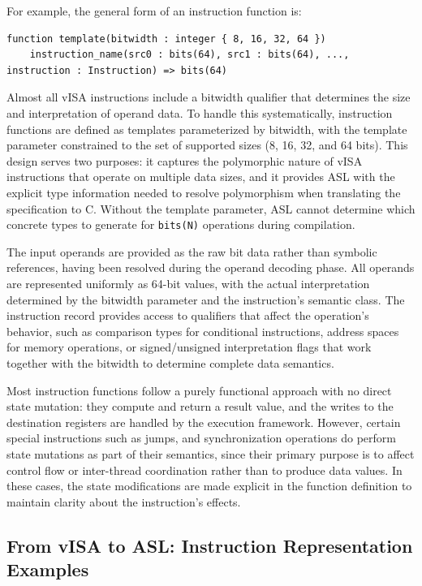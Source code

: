 For example, the general form of an instruction function is:
\begin{lstlisting}
function template(bitwidth : integer { 8, 16, 32, 64 }) 
    instruction_name(src0 : bits(64), src1 : bits(64), ..., instruction : Instruction) => bits(64)
\end{lstlisting}

Almost all vISA instructions include a bitwidth qualifier that determines the
size and interpretation of operand data. To handle this systematically,
instruction functions are defined as templates parameterized by bitwidth, with
the template parameter constrained to the set of supported sizes (8, 16, 32,
and 64 bits). This design serves two purposes: it captures the polymorphic
nature of vISA instructions that operate on multiple data sizes, and it
provides ASL with the explicit type information needed to resolve polymorphism
when translating the specification to C. Without the template parameter, ASL
cannot determine which concrete types to generate for \lstinline{bits(N)}
operations during compilation.

The input operands are provided as the raw bit data rather than symbolic
references, having been resolved during the operand decoding phase. All
operands are represented uniformly as 64-bit values, with the actual
interpretation determined by the bitwidth parameter and the instruction's
semantic class. The instruction record provides access to qualifiers that
affect the operation's behavior, such as comparison types for conditional
instructions, address spaces for memory operations, or signed/unsigned
interpretation flags that work together with the bitwidth to determine complete
data semantics.

Most instruction functions follow a purely functional approach with no direct
state mutation: they compute and return a result value, and the writes to the
destination registers are handled by the execution framework. However, certain
special instructions such as jumps, and synchronization operations do perform
state mutations as part of their semantics, since their primary purpose is to
affect control flow or inter-thread coordination rather than to produce data
values. In these cases, the state modifications are made explicit in the
function definition to maintain clarity about the instruction's effects.

\subsection{From vISA to ASL: Instruction Representation Examples}

